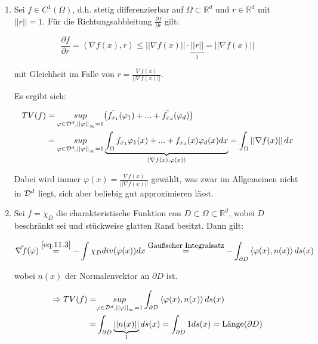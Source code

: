 \documentclass[ngerman]{article}
\theoremstyle{plain}
\theoremstyle{definition}
\numberwithin{equation}{section}
\newcommand{\norm}[1] {
\left|\left| #1 \right|\right|
}
\newcommand{\skprod}[2]{
\left \langle #1,#2 \right \rangle
}
\newcommand{\R}[0] {
\mathbb R
}
\newcommand{\C}[0]{
    \cdot
}
\begin{document}
\begin{enumerate}
    \item Sei $f \in C^1(\Omega)$, d.h. stetig differenzierbar auf $\Omega \subset \R^d$ und $r \in \R^d$ mit $\norm{r}=1$. Für die Richtungsabbleitung $\frac{\partial f}{\partial r}$ gilt:

    \[\frac{\partial f}{\partial r} = \skprod{\nabla f(x)}{r} \leq \norm{\nabla f(x)} \C \underbrace{\norm{r}}_{1} = \norm{\nabla f(x)}\]

    mit Gleichheit im Falle von $r = \frac{\nabla f(x)}{\norm{\nabla f(x)}}$.

    Es ergibt sich:

    \begin{align}\label{eq.11.5}
        TV(f) &= \underset{\varphi \in \D^d, \norm{\varphi}_\infty = 1}{sup} \bigl(\tilde{f_{x_1}}(\varphi_1) + ... + \tilde{f_{x_d}}(\varphi_d)\bigr) \nonumber \\
        &= \underset{\varphi \in \D^d, \norm{\varphi}_\infty = 1}{sup} \underbrace{\int_\Omega f_{x_1}\varphi_1(x) + ... + f_{x_d}(x)\varphi_d(x) dx}_{\skprod{\nabla f(x)}{\varphi(x)}} = \int_\Omega \norm{\nabla f(x)} dx
    \end{align}

    Dabei wird immer $\varphi(x) = \frac{\nabla f(x)}{\norm{\nabla f(x)}}$ gewählt, was zwar im Allgemeinen nicht in $\mathcal{D}^d$ liegt, sich aber beliebig gut approximieren lässt.

    \item Sei $f= \chi_D$ die charakteristische Funktion con $D \subset \Omega \subset \R^d$, wobei $D$ beschränkt sei und stückweise glatten Rand besitzt.
    Dann gilt:

    \[\tilde{\nabla f}(\varphi) \overset{\eqref{eq.11.3}}{=} - \int \chi_D div(\varphi(x)) dx \overset{\text{\small{Gaußscher Integralsatz}}}{=} -\int_{\partial D} \skprod{\varphi(x)}{n(x)} ds(x)\]

    wobei $n(x)$ der Normalenvektor an $\partial D$ ist.

    \begin{align}
        \Rightarrow TV(f) =& \underset{\varphi \in \D^d, \norm{\varphi}_\infty = 1}{sup} \int_{\partial D} \skprod{\varphi(x)}{n(x)} ds(x) \nonumber \\
        =& \int_{\partial D}\underbrace{\norm{n(x)}}_{1} ds(x) = \int_{\partial D} 1 ds(x) = \text{Länge}(\partial D)
    \end{align}
\end{enumerate}
\end{document}
